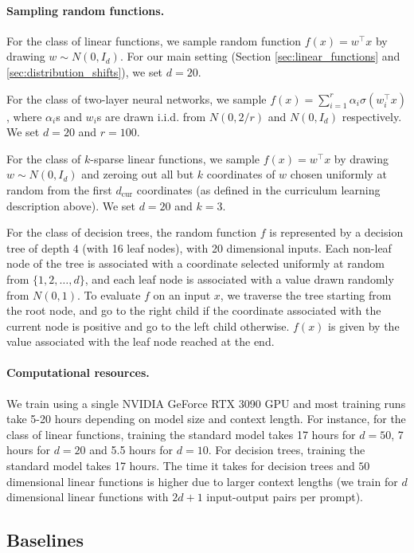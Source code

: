 \paragraph{Sampling random functions.} For the class of linear functions, we sample random function $f(x) = w^\top x$ by drawing $w \sim N(0, I_d)$. For our main setting (Section \ref{sec:linear_functions} and \ref{sec:distribution_shifts}), we set $d = 20$.

For the class of two-layer neural networks, we sample $f(x) = \sum_{i = 1}^r \alpha_i \sigma(w_i^\top x)$, where $\alpha_i$s and $w_i$s are drawn i.i.d. from $N(0, 2/r)$ and $N(0, I_d)$ respectively.  We set $d = 20$ and $r = 100$.

For the class of $k$-sparse linear functions, we sample $f(x) = w^\top x$ by drawing $w \sim N(0, I_d)$ and zeroing out all but $k$ coordinates of $w$ chosen uniformly at random from the first $d_\text{cur}$ coordinates (as defined in the curriculum learning description above).
We set $d = 20$ and $k = 3$. 

For the class of decision trees, the random function $f$ is represented by a decision tree of depth $4$ (with 16 leaf nodes), with 20 dimensional inputs. Each non-leaf node of the tree is associated with a coordinate selected uniformly at random from $\{1, 2, \ldots, d\}$, and each leaf node is associated with a value drawn randomly from $N(0, 1)$. To evaluate $f$ on an input $x$, we traverse the tree starting from the root node, and go to the right child if the coordinate associated with the current node is positive and go to the left child otherwise. $f(x)$ is given by the value associated with the leaf node reached at the end.

\paragraph{Computational resources.}
We train using a single NVIDIA GeForce RTX 3090 GPU and most training runs  take 5-20 hours depending on model size and context length. For instance, for the class of linear functions, training the standard model takes 17 hours for $d = 50$, 7 hours for $d = 20$ and 5.5 hours for $d = 10$. For decision trees, training the standard model takes 17 hours. The time it takes for decision trees and $50$ dimensional linear functions is higher due to larger context lengths (we train for $d$ dimensional linear functions with $2d+1$ input-output pairs per prompt).

\subsection{Baselines}
\label{app:baselines}
